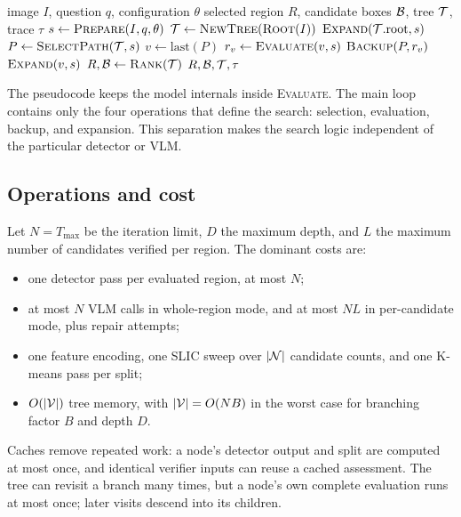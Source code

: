 \begin{algorithm}[t]
\caption{Bounded cost-aware visual search}
\label{alg:visual-search}
\begin{algorithmic}[1]
\Require image \(I\), question \(q\), configuration \(\theta\)
\Ensure selected region \(R\), candidate boxes \(\mathcal{B}\), tree \(\mathcal{T}\),
         trace \(\tau\)
\State \(s \gets \text{\textsc{Prepare}}(I,q,\theta)\)
\State \(\mathcal{T} \gets \text{\textsc{NewTree}}(\text{\textsc{Root}}(I))\)
\State \(\text{\textsc{Expand}}(\mathcal{T}.\text{root}, s)\)
  \State \(P \gets \text{\textsc{SelectPath}}(\mathcal{T},s)\)
  \State \(v \gets \text{last}(P)\)
  \State \(r_v \gets \text{\textsc{Evaluate}}(v,s)\)
  \State \(\text{\textsc{Backup}}(P,r_v)\)
  \State \(\text{\textsc{Expand}}(v,s)\)
\EndWhile
\State \(R,\mathcal{B} \gets \text{\textsc{Rank}}(\mathcal{T})\)
\State \Return \(R,\mathcal{B},\mathcal{T},\tau\)
\end{algorithmic}
\end{algorithm}

The pseudocode keeps the model internals inside \textsc{Evaluate}. The main loop
contains only the four operations that define the search: selection, evaluation,
backup, and expansion. This separation makes the search logic independent of
the particular detector or VLM.

\subsection{Operations and cost}

Let \(N=T_{\max}\) be the iteration limit, \(D\) the maximum depth, and \(L\) the
maximum number of candidates verified per region. The dominant costs are:
\begin{itemize}
  \item one detector pass per evaluated region, at most \(N\);
  \item at most \(N\) VLM calls in whole-region mode, and at most \(N L\) in
        per-candidate mode, plus repair attempts;
  \item one feature encoding, one SLIC sweep over \(|\mathcal{N}|\) candidate counts,
        and one K-means pass per split;
  \item \(O(|\mathcal{V}|)\) tree memory, with \(|\mathcal{V}|=O(NB)\) in the worst case
        for branching factor \(B\) and depth \(D\).
\end{itemize}
Caches remove repeated work: a node's detector output and split are computed at
most once, and identical verifier inputs can reuse a cached assessment. The tree
can revisit a branch many times, but a node's own complete evaluation runs at
most once; later visits descend into its children.

